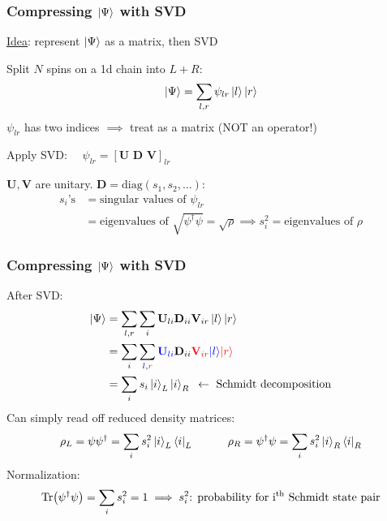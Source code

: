 \documentclass{beamer}
\theoremstyle{definition}
\begin{document}
\begin{frame}
	\frametitle{Compressing $\ket{\Psi}$ with SVD}
	\underline{Idea}: represent $\ket{\Psi}$ as a matrix, then SVD\\
	
	\pause
	
	\vspace{8pt}
	
	Split $N$ spins on a 1d chain into $L+R$: 
	\begin{align*}
		\ket{\Psi} = \sum_{l,r} \psi_{lr} \ket{l}\ket{r}
	\end{align*}
	$\psi_{lr}$ has two indices $\implies$ treat as a matrix (NOT an operator!) \\ 
	
	\pause
	
	\vspace{8pt} 
	
	Apply SVD: $\quad\psi_{lr} = [\mathbf{U}\,\,\mathbf{D}\,\,\mathbf{V}]_{lr}$\\
	
	\vspace{8pt}
	
	$\mathbf{U}, \mathbf{V}$ are unitary. $\mathbf{D} = \text{diag}(s_1,s_2,\dots)$:
	\begin{align*}
		s_i\text{'s} 
		&= \text{singular values of } \psi_{lr} \\
		&= \text{eigenvalues of } \sqrt{\psi^\dagger\psi} = \sqrt{\rho} \implies s_i^2 = \text{eigenvalues of } \rho
	\end{align*}
	
\end{frame}


\begin{frame}
	\frametitle{Compressing $\ket{\Psi}$ with SVD}
	
	After SVD:
	\begin{align*}
		\ket{\Psi} &= \sum_{l,r} \sum_{i} \mathbf{U}_{li}\mathbf{D}_{ii} \mathbf{V}_{ir} \ket{l}\ket{r}\\
		&= \sum_{i} \sum_{\textcolor{blue}{l},\textcolor{red}{r}}  \textcolor{blue}{\mathbf{U}_{li}}\mathbf{D}_{ii} \textcolor{red}{\mathbf{V}_{ir} } \textcolor{blue}{\ket{l}}\textcolor{red}{\ket{r}}\\
		&= \sum_i s_i \ket{i}_L \ket{i}_R \,\,\,\leftarrow \text{ Schmidt decomposition}
	\end{align*}
\pause 
	Can simply read off reduced density matrices:
	\begin{align*}
		\rho_L = \psi\psi^\dagger = \sum_i s_i^2 \ket{i}_L \bra{i}_L \quad\quad\quad \rho_R = \psi^\dagger\psi = \sum_i s_i^2 \ket{i}_R \bra{i}_R
	\end{align*}
\pause
	Normalization:
	\begin{align*}
		\Tr(\psi^\dagger\psi) = \sum_i s_i^2 = 1 \implies s_i^2 \text{: probability for i$^\text{th}$ Schmidt state pair}
	\end{align*}
\end{frame}
\end{document}
